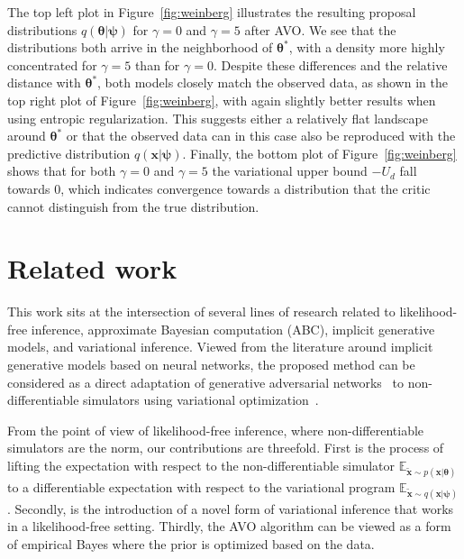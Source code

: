 \documentclass{article}
\newcommand{\qxpsi}{q(\mathbf{x}|\bfpsi)}
\newcommand{\bftheta}{{\bm \theta}}
\newcommand{\bfpsi}{{\bm \psi}}
\newcommand{\bfx}{\mathbf{x}}
\theoremstyle{plain}
\begin{document}
The top left plot in Figure~\ref{fig:weinberg} illustrates the resulting
proposal distributions $q(\bftheta|\bfpsi)$ for $\gamma=0$ and $\gamma=5$ after
AVO. We see that the distributions both arrive
in the neighborhood of $\bftheta^*$, with a density  more highly concentrated for
$\gamma=5$ than for $\gamma=0$.  Despite these differences and the relative
distance with $\bftheta^*$, both models closely match the observed data, as shown
in the top right plot of  Figure~\ref{fig:weinberg}, with again slightly better
results when using entropic regularization. This suggests either a relatively flat
landscape around $\bftheta^*$ or that the observed data can in this case also be
reproduced with the  predictive distribution $\qxpsi$.
Finally, the bottom plot of Figure~\ref{fig:weinberg} shows that for both
$\gamma=0$ and $\gamma=5$ the variational upper bound $-U_d$ fall
towards $0$, which indicates  convergence towards a distribution that the critic
cannot distinguish from the true distribution.



\section{Related work}

This work sits at the intersection of several lines of research related to
likelihood-free inference, approximate Bayesian computation (ABC),
implicit generative models, and variational inference.
Viewed from the literature around implicit generative models based on neural networks,
the proposed method can be considered as a direct adaptation of
generative adversarial networks~\cite{goodfellow2014generative,2017arXiv170104862A} to
non-differentiable simulators using variational optimization~\cite{2012arXiv1212.4507S}.

From the point of view of likelihood-free inference, where  non-differentiable
simulators are the norm, our contributions are threefold. First is the process
of lifting the expectation with respect to the non-differentiable simulator
$\mathbb{E}_{\tilde{\bfx} \sim p(\bfx | \bftheta)}$ to a differentiable
expectation with respect to the variational program $\mathbb{E}_{\tilde{\bfx}
\sim q(\bfx | \bfpsi)}$. Secondly, is the introduction of a novel form of
variational inference that works in a likelihood-free setting. Thirdly, the
AVO algorithm can be viewed as a form of empirical Bayes where the prior is
optimized based on the data.
\end{document}
